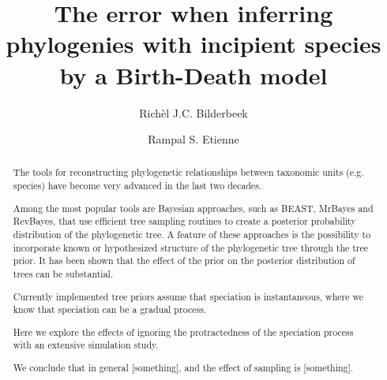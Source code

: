 \documentclass{article}
\title{The error when inferring phylogenies with incipient species by a Birth-Death model}
\author[1]{Rich\`el J.C. Bilderbeek}
\author[1]{Rampal S. Etienne}
\affil[1]{Groningen Institute for Evolutionary Life Sciences, University of Groningen, Groningen, The Netherlands}
\begin{document}
\maketitle

\begin{abstract}



  The tools for reconstructing phylogenetic relationships between taxonomic 
  units (e.g. species) have become very advanced in the last two decades. 

  Among the most popular tools are Bayesian approaches, such as BEAST, MrBayes and RevBayes, 
  that use efficient tree sampling routines to create a posterior probability distribution 
  of the phylogenetic tree. 
  A feature of these approaches is the possibility to incorporate 
  known or hypothesized structure of the phylogenetic tree through the tree prior. 
  It has been shown that the effect of the prior on the posterior distribution 
  of trees can be substantial. 

  Currently implemented tree priors assume that speciation is instantaneous,
  where we know that speciation can be a gradual process.

  Here we explore the effects of ignoring 
  the protractedness of the speciation process with an extensive simulation study. 




  We conclude that in general [something], and the effect of sampling is [something]. 


\end{abstract}
\end{document}
